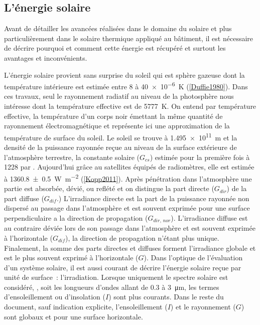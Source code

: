 \subsection{L’énergie solaire} %
\label{sub:l_energie_solaire}
Avant de détailler les avancées réalisées dans le domaine du solaire et plus particulièrement
dans le solaire thermique appliqué au bâtiment, il est nécessaire de décrire pourquoi
et comment cette énergie est récupéré et surtout les avantages et inconvénients.

L’énergie solaire provient sans surprise du soleil qui est sphère gazeuse
dont  la température intérieure est estimée entre \num{8} à \SI{40e-6}{\kelvin}
(\ref{Duffie1980}). Dans ces travaux, seul le rayonnement radiatif au niveau de la
photosphère nous intéresse dont la température effective est de \SI{5777}{\kelvin}. On
entend par température effective, la température d’un corps noir émettant la même quantité
de rayonnement électromagnétique et représente ici une approximation de la température de
surface du soleil.
Le soleil se trouve à \SI{1.495e11}{\metre} et la densité de la
puissance rayonnée reçue au niveau de la surface extérieure de l’atmosphère terrestre, la
constante solaire ($G_{cs}$) estimée pour la première fois à \num{1228} par .
Aujourd’hui grâce au satellites équipés de radiomètres, elle est estimée
à \SI{1360.8 +- 0.5}{\watt\per\metre\squared} (\ref{Kopp2011}). Après
pénétration dans l’atmosphère une partie est absorbée, dévié, ou reflété et on distingue
la part directe ($G_{dir}$) de la part diffuse ($G_{dif}$.) L’irradiance directe est la part de la puissance
rayonnée non dispersé au passage dans l’atmosphère et est souvent exprimée pour une surface perpendiculaire
a la direction de propagation ($G_{dir,\,nor}$). L’irradiance diffuse est au contraire
déviée lors de son passage dans l’atmosphère et est souvent exprimée à l’horizontale
($G_{dif}$), la direction de propagation n’étant plus unique. Finalement, la somme des
parts directes et diffuses forment l’irradiance globale et est le plus souvent exprimé à
l’horizontale ($G$). Dans l’optique de l’évaluation d’un système solaire, il est
aussi courant de décrire l’énergie solaire reçue par unité de surface~: l’irradiation.
Lorsque uniquement le spectre solaire est considéré,
, soit les longueurs d’ondes allant de \num{0.3} à \SI{3}{\micro\metre}, les termes
d’ensoleillement ou d’insolation ($I$) sont plus courants.
Dans le reste du document, sauf indication explicite, l’ensoleillement ($I$) et le rayonnement ($G$)
sont globaux et pour une surface horizontale.

